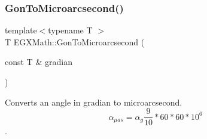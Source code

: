 \mbox{\label{group___e_g_x_math-_angle_conversions-_gon_gae3f14ff3441def6d88fed69f2466cf82}} 
\subsubsection{\texorpdfstring{Gon\+To\+Microarcsecond()}{GonToMicroarcsecond()}}
{\footnotesize\ttfamily template$<$typename T $>$ \\
T E\+G\+X\+Math\+::\+Gon\+To\+Microarcsecond (\begin{DoxyParamCaption}\item[{const T \&}]{gradian }\end{DoxyParamCaption})}



Converts an angle in gradian to microarcsecond. \[\alpha_{\mu as}=\alpha_{g}\frac{9}{10} * 60 * 60 * 10^6\]. 

